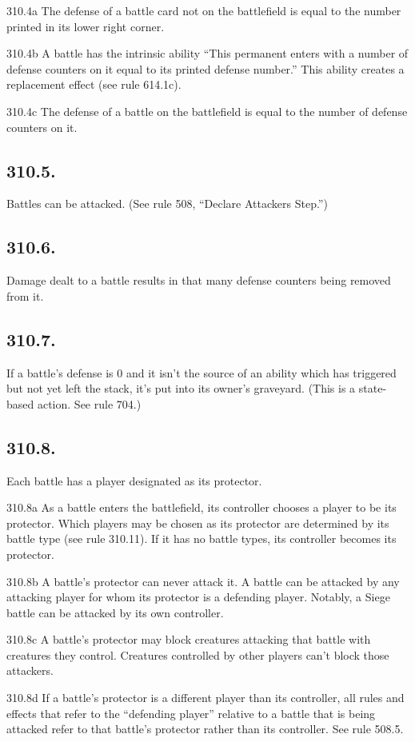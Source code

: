 310.4a The defense of a battle card not on the battlefield is equal to the number printed in its lower right corner.

310.4b A battle has the intrinsic ability “This permanent enters with a number of defense counters on it equal to its printed defense number.” This ability creates a replacement effect (see rule 614.1c).

310.4c The defense of a battle on the battlefield is equal to the number of defense counters on it.

\subsection*{310.5.}
Battles can be attacked. (See rule 508, “Declare Attackers Step.”)

\subsection*{310.6.}
Damage dealt to a battle results in that many defense counters being removed from it.

\subsection*{310.7.}
If a battle’s defense is 0 and it isn’t the source of an ability which has triggered but not yet left the stack, it’s put into its owner’s graveyard. (This is a state-based action. See rule 704.)

\subsection*{310.8.}
Each battle has a player designated as its protector.

310.8a As a battle enters the battlefield, its controller chooses a player to be its protector. Which players may be chosen as its protector are determined by its battle type (see rule 310.11). If it has no battle types, its controller becomes its protector.

310.8b A battle’s protector can never attack it. A battle can be attacked by any attacking player for whom its protector is a defending player. Notably, a Siege battle can be attacked by its own controller.

310.8c A battle’s protector may block creatures attacking that battle with creatures they control. Creatures controlled by other players can’t block those attackers.

310.8d If a battle’s protector is a different player than its controller, all rules and effects that refer to the “defending player” relative to a battle that is being attacked refer to that battle’s protector rather than its controller. See rule 508.5.

